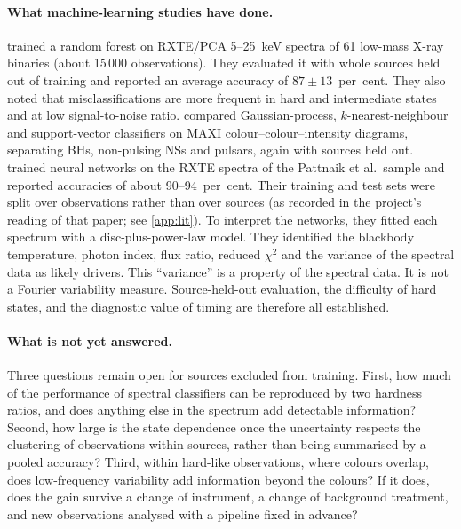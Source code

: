 \documentclass[11pt,a4paper]{article}
\begin{document}
\paragraph{What machine-learning studies have done.}
\citet{Pattnaik2021} trained a random forest on RXTE/PCA 5--25~keV spectra of 61 low-mass X-ray binaries (about 15\,000
observations). They evaluated it with whole sources held out of training and reported an average accuracy of
$87\pm13$~per~cent. They also noted that misclassifications are more frequent in hard and intermediate states and at low
signal-to-noise ratio. \citet{deBeurs2022} compared Gaussian-process, $k$-nearest-neighbour and support-vector classifiers
on MAXI colour--colour--intensity diagrams, separating BHs, non-pulsing NSs and pulsars, again with sources held out.
\citet{Garg2026} trained neural networks on the RXTE spectra of the Pattnaik et al.\ sample and reported accuracies of
about 90--94~per~cent. Their training and test sets were split over observations rather than over sources (as recorded
in the project's reading of that paper; see \cref{app:lit}). To interpret the networks, they fitted each spectrum with a
disc-plus-power-law model. They identified the blackbody temperature, photon index, flux ratio, reduced $\chi^2$ and the
variance of the spectral data as likely drivers. This ``variance'' is a property of the spectral data. It is not a
Fourier variability measure. Source-held-out evaluation, the difficulty of hard states, and the diagnostic value of
timing are therefore all established.

\paragraph{What is not yet answered.}
Three questions remain open for sources excluded from training. First, how much of the performance of spectral
classifiers can be reproduced by two hardness ratios, and does anything else in the spectrum add detectable information?
Second, how large is the state dependence once the uncertainty respects the clustering of observations within sources,
rather than being summarised by a pooled accuracy? Third, within hard-like observations, where colours overlap, does
low-frequency variability add information beyond the colours? If it does, does the gain survive a change of instrument,
a change of background treatment, and new observations analysed with a pipeline fixed in advance?
\end{document}
